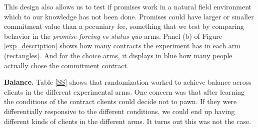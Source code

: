 \documentclass[oneside,11pt]{article}
\begin{document}
This design also allows us to test if promises work in a natural field environment which to our knowledge has not been done. Promises could have larger or smaller commitment value than a pecuniary fee, something that we test by comparing behavior in the \textit{promise-forcing} vs \textit{status quo} arms. Panel (b) of Figure \ref{exp_description} shows how many contracts the experiment has in each arm (rectangles). And for the choice arms, it displays in blue how many people actually chose the commitment contract.





    
\vspace{.2in}
\noindent \textbf{Balance.} Table \ref{SS} shows that randomization worked to achieve balance across clients in the different experimental arms. One concern was that after learning the conditions of the contract clients could decide not to pawn. If they were differentially responsive to the different conditions, we could end up having different kinds of clients in the different arms. It turns out this was not the case.
\end{document}
